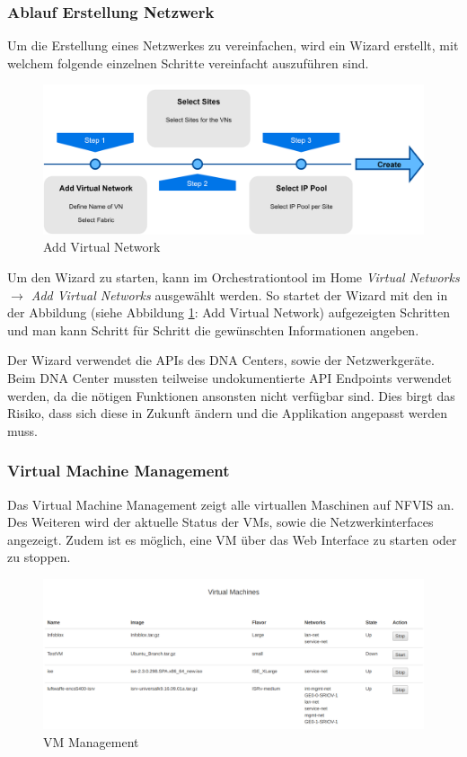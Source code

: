 \subsubsection{Ablauf Erstellung Netzwerk}
Um die Erstellung eines Netzwerkes zu vereinfachen, wird ein Wizard erstellt, mit welchem folgende einzelnen Schritte vereinfacht auszuführen sind. 

\begin{figure}[H]
	\centering
	\includegraphics[width=0.8\linewidth]{img/Abstrahierung/addvirtualnetwork}
	\caption{Add Virtual Network}
	\label{fig:Add Virtual Network}
\end{figure}

Um den Wizard zu starten, kann im Orchestrationtool im Home \textit{Virtual Networks $\rightarrow$ Add Virtual Networks} ausgewählt werden. So startet der Wizard mit den in der Abbildung (siehe Abbildung \ref{fig:Add Virtual Network}: Add Virtual Network) aufgezeigten Schritten und man kann Schritt für Schritt die gewünschten Informationen angeben.

Der Wizard verwendet die APIs des DNA Centers, sowie der Netzwerkgeräte. Beim DNA Center mussten teilweise undokumentierte API Endpoints verwendet werden, da die nötigen Funktionen ansonsten nicht verfügbar sind. Dies birgt das Risiko, dass sich diese in Zukunft ändern und die Applikation angepasst werden muss.

\subsubsection{Virtual Machine Management}

Das Virtual Machine Management zeigt alle virtuallen Maschinen auf NFVIS an. Des Weiteren wird der aktuelle Status der VMs, sowie die Netzwerkinterfaces angezeigt. Zudem ist es möglich, eine VM über das Web Interface zu starten oder zu stoppen.

\begin{figure}[H]
	\centering
	\includegraphics[width=0.8\linewidth]{img/Abstrahierung/vm-management.png}
	\caption{VM Management}
	\label{fig:VM Management}
\end{figure}


